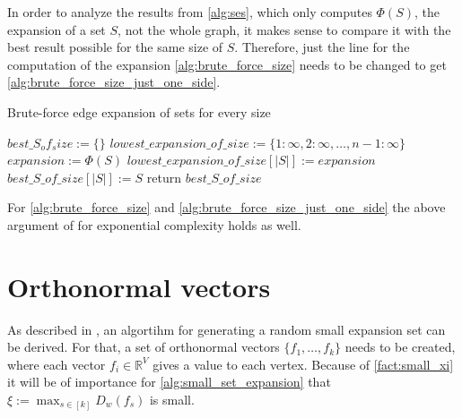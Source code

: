 In order to analyze the results from \cref{alg:ses}, which only computes $\Phi(S)$, the expansion of a set $S$, not the whole graph, it makes sense to compare it with the best result possible for the same size of $S$. Therefore, just the line for the computation of the expansion \cref{alg:brute_force_size} needs to be changed to get \cref{alg:brute_force_size_just_one_side}.

\begin{algorithm}[H]
	\caption{Brute-force edge expansion of sets for every size   \label{alg:brute_force_size_just_one_side}}
	\begin{algorithmic}
		\State $best\_S_of_size := \{\}$
		\State $lowest\_expansion\_of\_size := \{1:\infty, 2:\infty, \ldots, n-1: \infty \}$
		\State $expansion :=  \Phi(S)$
		\State $ lowest\_expansion\_of\_size[|S|] := expansion$
		\State $best\_S\_of\_size[|S|] := S$
		\EndIf
		\EndFor	
		\State return $best\_S\_of\_size$
		\EndFunction
	\end{algorithmic}
\end{algorithm}
For \cref{alg:brute_force_size} and \cref{alg:brute_force_size_just_one_side} the above argument of for exponential complexity holds as well.

\section{Orthonormal vectors}
As described in \cite{ChanLTZ16}, an algortihm for generating a random small expansion set can be derived. For that, a set of orthonormal vectors $\{f_1, \ldots, f_k\}$ needs to be created, where each vector $f_i \in \mathbb{R}^V$ gives a value to each vertex. Because of \cref{fact:small_xi} it will be of importance for \cref{alg:small_set_expansion} that  $\xi := \max_{s \in [k]} D_w(f_s)   $ is small.





